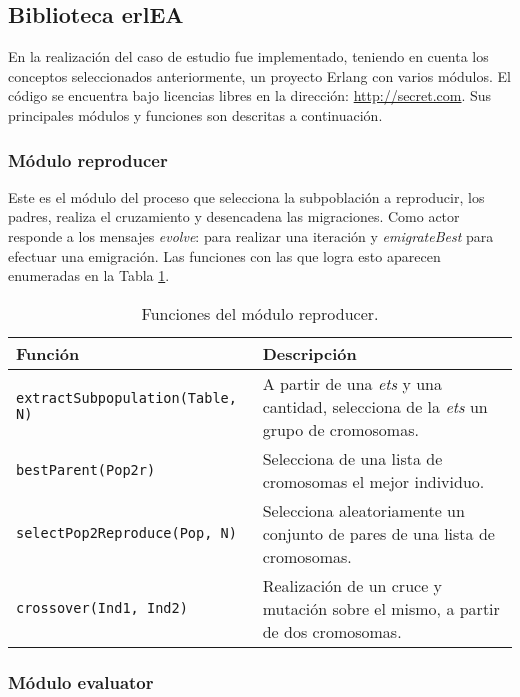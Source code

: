 \documentclass[runningheads]{llncs}
\begin{document}
\subsection{Biblioteca erlEA}

En la realización del caso de estudio fue implementado, teniendo en cuenta los conceptos seleccionados anteriormente, un proyecto Erlang con varios módulos. El código se encuentra bajo licencias libres en la dirección: \url{http://secret.com}. Sus principales módulos y funciones son descritas a continuación.


\subsubsection{Módulo reproducer}

Este es el módulo del proceso que selecciona la subpoblación a reproducir, los padres, realiza el cruzamiento y desencadena las migraciones. Como actor responde a los mensajes {\em evolve}: para realizar una iteración y {\em emigrateBest} para efectuar una emigración. Las funciones con las que logra esto aparecen enumeradas en la Tabla \ref{tb:reproducer}.

\begin{table}
  \centering
\begin{tabular}{|p{5cm}|p{7cm}|}
  \hline
   \textbf{Función} &  \textbf{Descripción} \\
  \hline
  {\tt extractSubpopulation(Table, N) } & A partir de una {\em ets} y una cantidad, selecciona de la {\em ets} un grupo de cromosomas. \\
  \hline
  {\tt bestParent(Pop2r)} & Selecciona de una lista de cromosomas el mejor individuo. \\
  \hline
 {\tt selectPop2Reproduce(Pop, N)} & Selecciona aleatoriamente un conjunto de pares de una lista de cromosomas. \\
  \hline
  {\tt crossover(Ind1, Ind2)} & Realización de un cruce y mutación sobre el mismo, a partir de dos cromosomas. \\
  \hline
\end{tabular}
  \caption{Funciones del módulo reproducer.}\label{tb:reproducer}
\end{table}


\subsubsection{Módulo evaluator}
\end{document}
